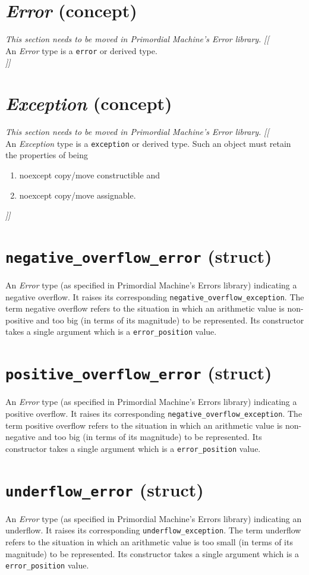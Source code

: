 \documentclass[oneside]{book}
\begin{document}
\section{\textit{Error} (concept)}
\textit{\color{orange}This section needs to be moved in Primordial Machine's Error library.}
\noindent\textit{\color{orange}[[}\\
An \textit{Error} type is a \texttt{error} or derived type.\\
\noindent\textit{\color{orange}]]}

\section{\textit{Exception} (concept)}
\textit{\color{orange}This section needs to be moved in Primordial Machine's Error library.}
\noindent\textit{\color{orange}[[}\\
An \textit{Exception} type is a \texttt{exception} or derived type.
Such an object must retain the properties of being
\begin{enumerate}
  \item noexcept copy/move constructible and
  \item noexcept copy/move assignable.
\end{enumerate}
\noindent\textit{\color{orange}]]}

\section{\texttt{negative\_overflow\_error} (struct)}
An \textit{Error} type (as specified in Primordial Machine's Errors library) indicating a negative overflow.
It raises its corresponding \texttt{negative\_overflow\_exception}.
The term negative overflow refers to the situation in which an arithmetic value is non-positive and
too big (in terms of its magnitude) to be represented. Its constructor takes a single argument which
is a \texttt{error\_position} value.

\section{\texttt{positive\_overflow\_error} (struct)}
An \textit{Error} type (as specified in Primordial Machine's Errors library) indicating a positive overflow.
It raises its corresponding \texttt{negative\_overflow\_exception}.
The term positive overflow refers to the situation in which an arithmetic value is non-negative and
too big (in terms of its magnitude) to be represented. Its constructor takes a single argument which
is a \texttt{error\_position} value.

\section{\texttt{underflow\_error} (struct)}
An \textit{Error} type (as specified in Primordial Machine's Errors library) indicating an underflow.
It raises its corresponding \texttt{underflow\_exception}.
The term underflow refers to the situation in which an arithmetic value is too small (in terms of
its magnitude) to be represented. Its constructor takes a single argument which
is a \texttt{error\_position} value.


\end{document}
